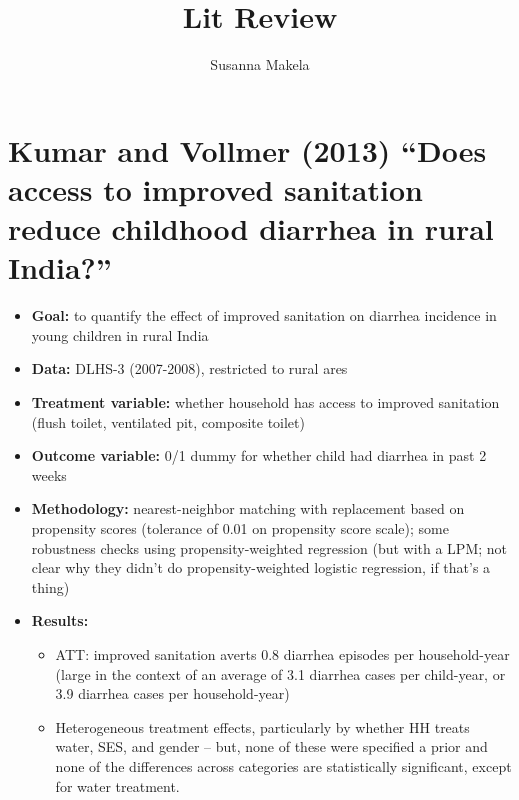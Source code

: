 \documentclass[10pt,a4paper]{article}
\author{Susanna Makela}
\title{Lit Review}
\begin{document}
\maketitle

\section*{Kumar and Vollmer (2013) ``Does access to improved sanitation reduce childhood diarrhea in rural India?''}
\begin{itemize}
	\item \textbf{Goal:} to quantify the effect of improved sanitation on diarrhea incidence in young children in rural India
	\item \textbf{Data:} DLHS-3 (2007-2008), restricted to rural ares
	\item \textbf{Treatment variable:} whether household has access to improved sanitation (flush toilet, ventilated pit, composite toilet)
	\item \textbf{Outcome variable:} 0/1 dummy for whether child had diarrhea in past 2 weeks
	\item \textbf{Methodology:} nearest-neighbor matching with replacement based on propensity scores (tolerance of 0.01 on propensity score scale); some robustness checks using propensity-weighted regression (but with a LPM; not clear why they didn't do propensity-weighted logistic regression, if that's a thing)
	\item \textbf{Results:}
		\begin{itemize}
			\item ATT: improved sanitation averts 0.8 diarrhea episodes per household-year (large in the context of an average of 3.1 diarrhea cases per child-year, or 3.9 diarrhea cases per household-year)
			\item Heterogeneous treatment effects, particularly by whether HH treats water, SES, and gender -- but, none of these were specified a prior and none of the differences across categories are statistically significant, except for water treatment.
		\end{itemize}	
\end{itemize}
\end{document}
